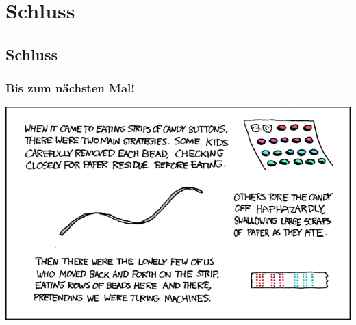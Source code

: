 \section{Schluss}
\subsection{Schluss}
\begin{frame}
\frametitle{Bis zum nächsten Mal!}
\begin{center}
  \includegraphics[width=1 \textheight]{images/xkcd_205.png}
\end{center}
\end{frame}


